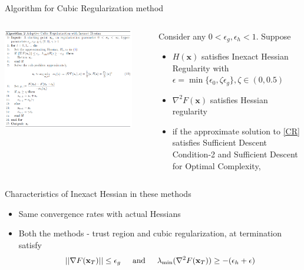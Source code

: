 \documentclass[10pt]{beamer}
\newcommand{\h}{\nabla^{2}}
\newcommand{\g}{\nabla}
\newcommand{\xbold}{\mathbf{x}}
\newcommand{\mineig}{\lambda_{\min}}
\begin{document}
\begin{frame}{Algorithm for Cubic Regularization method}
\begin{columns}
\centering
\includegraphics[width=0.9\textwidth]{./images/algo-2.png}
\begin{theorem}
Consider any \(0 < \epsilon_{g}, \epsilon_{h} < 1\). Suppose
\begin{itemize}
\item<1->{\(H(\xbold)\) satisfies Inexact Hessian Regularity with \(\epsilon = \min\{\epsilon_{0}, \zeta \epsilon_{g}\}, \zeta \in (0, 0.5)\)}
\item<2->{\(\h F(\xbold)\) satisfies Hessian regularity}
\item<3->{if the approximate solution to \ref{CR} satisfies Sufficient Descent Condition-2 and Sufficient Descent for Optimal Complexity}, 
\end{itemize}
\end{theorem}
\end{columns}
\end{frame}

\begin{frame}{Characteristics of Inexact Hessian in these methods}
\begin{itemize}
\item<1->{Same convergence rates with actual Hessians}
\item<2->{Both the methods - trust region and cubic regularization, at termination satisfy
  \begin{equation*}
  ||\g F(\xbold_{T})|| \leq \epsilon_{g} \hspace{4mm} \text{ and } \hspace{4mm} \mineig(\h F(\xbold_{T})) \geq -(\epsilon_{h} + \epsilon)
  \end{equation*}
} 
\end{itemize}
\end{frame}
\end{document}
